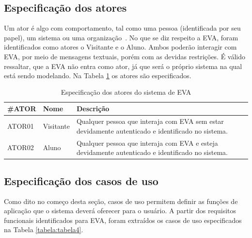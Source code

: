 \subsection{Especificação dos atores}

Um ator é algo com comportamento, tal como uma pessoa (identificada por seu papel), um sistema ou uma organização~\cite{CraigLarman}. 
No que se diz respeito a EVA, foram identificados como atores o Visitante e o Aluno. 
Ambos poderão interagir com EVA, por meio de mensagens textuais, porém com as devidas restrições. 
É válido ressaltar, que a EVA não entra como ator, já que será o próprio sistema na qual está sendo modelando. 
Na Tabela \ref{tabela:tabela3} os atores são especificados.

\begin{table}[htb!]
\caption{Especificação dos atores do sistema de EVA}
\label{tabela:tabela3}
\center
\footnotesize
\begin{tabular}{|p{2cm}|p{3cm}|p{7.5cm}|}
  \hline
   \textbf{\#ATOR} & \textbf{Nome}  & \textbf{Descrição}  \\
   \hline
    ATOR01 & Visitante & Qualquer pessoa que interaja com EVA sem estar devidamente autenticado e identificado no sistema. \\
   \hline
    ATOR02 & Aluno & Qualquer pessoa que interaja com EVA e esteja devidamente autenticado e identificado no sistema. \\
   \hline
\end{tabular}
\end{table}

\subsection{Especificação dos casos de uso}

Como dito no começo desta seção, casos de uso permitem definir as funções de aplicação que o sistema deverá oferecer para o usuário. A partir dos requisitos funcionais identificados para EVA, foram extraídos os casos de uso especificados na Tabela \ref{tabela:tabela4}.

